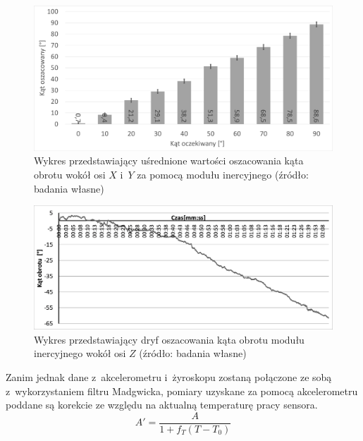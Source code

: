 \begin{savenotes}
	\begin{figure}[!htb]																													
		\centering 
		\includegraphics[width=\textwidth]{images/imumeasuredAngles.png}
		\caption{Wykres przedstawiający uśrednione wartości oszacowania kąta obrotu wokół osi $X$ i~$Y$ za pomocą modułu inercyjnego (źródło: badania własne)}
		\label{fig:hybrid:imu:XYRot}
	\end{figure}
\end{savenotes}
\begin{savenotes}
	\begin{figure}[!htb]
		\centering 
		\includegraphics[width=\textwidth]{images/imuDrift.png}
		\caption{Wykres przedstawiający dryf oszacowania kąta obrotu modułu inercyjnego wokół osi $Z$ (źródło: badania własne)}
		\label{fig:hybrid:imu:drift}																														
	\end{figure}
\end{savenotes}
						
Zanim jednak dane z~akcelerometru i~żyroskopu zostaną połączone ze sobą z~wykorzystaniem filtru Madgwicka, pomiary uzyskane za pomocą akcelerometru poddane są korekcie ze względu na aktualną temperaturę pracy sensora.
\begin{equation}
	A' = \frac{A}{1+f_T (T-T_0)}
	\label{eq:hybrid:temperatureCorrection}
\end{equation}

